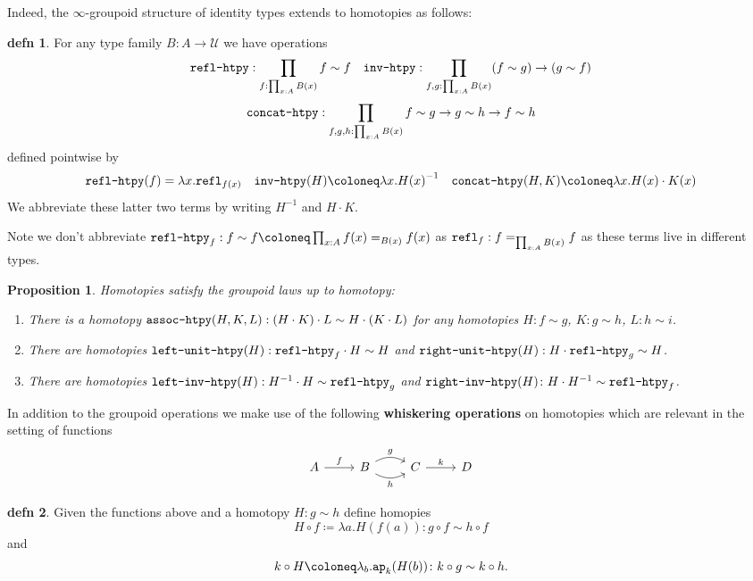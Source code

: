 \documentclass{amsart}
\theoremstyle{theorem}
\newtheorem*{prop}{Proposition}
\theoremstyle{definition}
\newtheorem*{defn}{defn}
\theoremstyle{remark}
\newcommand{\0}{\mathbbe{0}}
\newcommand{\1}{\mathbbe{1}}
\newcommand{\2}{\mathbbe{2}}
\newcommand{\3}{\mathbbe{3}}
\newcommand{\4}{\mathbbe{4}}
\newcommand{\term}[1]{{\textup{\texttt{#1}}}}
\newcommand{\refl}{\term{refl}}
\newcommand{\ap}{\term{ap}}
\newcommand{\UU}{{\mathcal{U}}}
\begin{document}
Indeed, the $\infty$-groupoid structure of identity types extends to homotopies as follows:

\begin{defn} For any type family $B \colon A \to \UU$ we have operations
\[ \term{refl-htpy} : \prod_{f : \prod_{x:A}B(x)} f \sim f \quad \term{inv-htpy} : \prod_{f,g :\prod_{x:A}B(x)} (f \sim g) \to (g \sim f) \]
\[ \term{concat-htpy} : \prod_{f,g,h : \prod_{x:A}B(x)} f \sim g \to g \sim h \to f \sim h\]
defined pointwise by
\[ \term{refl-htpy}(f) = \lambda x .\refl_{f(x)} \quad \term{inv-htpy}(H) \coloneq \lambda x. {H(x)}^{-1} \quad \term{concat-htpy}(H,K) \coloneq \lambda x. H(x) \cdot K(x)\]
We abbreviate these latter two terms by writing $H^{-1}$ and $H \cdot K$.
\end{defn}

Note we don't abbreviate $\term{refl-htpy}_f : f \sim f \coloneq \prod_{x :A} f(x)=_{B(x)} f(x)$ as $\refl_f : f =_{\prod_{x:A}B(x)}f$ as these terms live in different types.

\begin{prop} Homotopies satisfy the groupoid laws up to homotopy:
\begin{enumerate}
\item There is a homotopy $\term{assoc-htpy}(H,K,L) : (H \cdot K) \cdot L \sim H \cdot (K \cdot L)$ for any homotopies $H : f \sim g$, $K : g \sim h$, $L \colon h \sim i$.
\item There are homotopies $\term{left-unit-htpy}(H) : \term{refl-htpy}_f \cdot H \sim H$ and $\term{right-unit-htpy}(H) : H \cdot \term{refl-htpy}_g \sim H$.
\item There are homotopies $\term{left-inv-htpy}(H) : H^{-1} \cdot H \sim \term{refl-htpy}_g$ and $\term{right-inv-htpy}(H) \colon H \cdot H^{-1} \sim \term{refl-htpy}_f$.
\end{enumerate}
\end{prop}

In addition to the groupoid operations we make use of the following \textbf{whiskering operations} on homotopies which are relevant in the setting of functions
\[
\begin{tikzcd} A \arrow[r, "f"] & B \arrow[r, bend left, "g"] \arrow[r, bend right, "h"'] & C \arrow[r, "k"] & D
\end{tikzcd}
\]

\begin{defn} Given the functions above and a homotopy $H \colon g \sim h$ define homopies
\[ H \circ f \coloneq \lambda a. H(f(a)) \colon g \circ f \sim h \circ f\]
and
\[
k \circ H \coloneq \lambda_b. \ap_k(H(b)) \colon k \circ g \sim k \circ h.\]
\end{defn}
\end{document}
